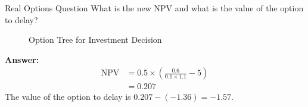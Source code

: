\begin{examplebox}{Real Options Question}
    What is the new NPV and what is the value of the option to delay?

    \begin{figure}[H]
        \centering
        \caption{Option Tree for Investment Decision}
        \label{fig:option-tree-2}
    \end{figure}

    \textbf{Answer: }
    \begin{align*}
        \text{NPV} &= 0.5 \times \left(\frac{0.6}{0.1 \times 1.1} - 5\right) \\
        &= 0.207
    \end{align*}
    The value of the option to delay is $ 0.207 - (-1.36) = -1.57$.



\end{examplebox}
